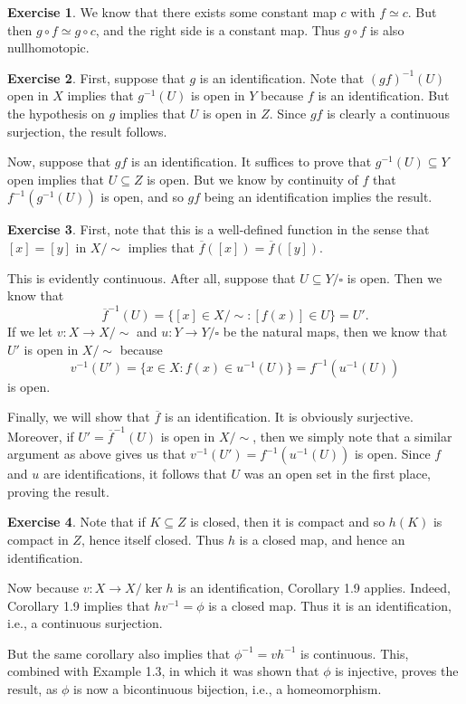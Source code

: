 \documentclass[10pt]{article}
\theoremstyle{definition}
\newtheorem{intex}{Exercise}[section]
\newenvironment{exercise}{\begin{intex}\label{\theintex}}{\end{intex}}
\newcommand{\ecls}{%
  {\sim}%
}
\begin{document}
\begin{exercise} \leavevmode
We know that there exists some constant map $c$ with $f\simeq c$. But then $g\circ f\simeq g\circ c$, and the right side is a constant map. Thus $g\circ f$ is also nullhomotopic. 
\end{exercise} 

\begin{exercise} \leavevmode
First, suppose that $g$ is an identification. Note that $(gf)^{-1}(U)$ open in $X$ implies that $g^{-1}(U)$ is open in $Y$ because $f$ is an identification. But the hypothesis on $g$ implies that $U$ is open in $Z$. Since $gf$ is clearly a continuous surjection, the result follows. 

Now, suppose that $gf$ is an identification. It suffices to prove that $g^{-1}(U)\subseteq Y$ open implies that $U\subseteq Z$ is open. But we know by continuity of $f$ that $f^{-1}(g^{-1}(U))$ is open, and so $gf$ being an identification implies the result. 
\end{exercise} 

\begin{exercise} \leavevmode
First, note that this is a well-defined function in the sense that $[x]=[y]$ in $X/\ecls$ implies that $\overline f([x])=\overline f([y])$. 

This is evidently continuous. After all, suppose that $U\subseteq Y/\square$ is open. Then we know that \[\overline f^{-1}(U)=\{[x]\in X/\ecls:[f(x)]\in U\}=U'.\] If we let $v:X\to X/\ecls$ and $u:Y\to Y/\square$ be the natural maps, then we know that $U'$ is open in $X/\ecls$ because \[v^{-1}(U')=\{x\in X:f(x)\in u^{-1}(U)\}=f^{-1}(u^{-1}(U))\] is open. 

Finally, we will show that $\overline f$ is an identification. It is obviously surjective. Moreover, if $U'=\overline f^{-1}(U)$ is open in $X/\ecls$, then we simply note that a similar argument as above gives us that $v^{-1}(U')=f^{-1}(u^{-1}(U))$ is open. Since $f$ and $u$ are identifications, it follows that $U$ was an open set in the first place, proving the result. 
\end{exercise} 

\begin{exercise} \leavevmode
Note that if $K\subseteq Z$ is closed, then it is compact and so $h(K)$ is compact in $Z$, hence itself closed. Thus $h$ is a closed map, and hence an identification. 

Now because $v:X\to X/\ker h$ is an identification, Corollary 1.9 applies. Indeed, Corollary 1.9 implies that $hv^{-1}=\phi$ is a closed map. Thus it is an identification, i.e., a continuous surjection. 

But the same corollary also implies that $\phi^{-1}=vh^{-1}$ is continuous. This, combined with Example 1.3, in which it was shown that $\phi$ is injective, proves the result, as $\phi$ is now a bicontinuous bijection, i.e., a homeomorphism. 
\end{exercise} 
\end{document}
